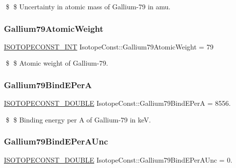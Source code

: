 \$ \$ Uncertainty in atomic mass of Gallium-\/79 in amu. \mbox{\label{group___isotope_const-_gallium-_ga79_ga2dd60aeb88e02b59578ea30111477335}} 
\subsubsection{\texorpdfstring{Gallium79\+Atomic\+Weight}{Gallium79AtomicWeight}}
{\footnotesize\ttfamily \mbox{\hyperlink{group___isotope_const-_macros_ga5f18360b3e99483a35c32d789e62621c}{I\+S\+O\+T\+O\+P\+E\+C\+O\+N\+S\+T\+\_\+\+I\+NT}} Isotope\+Const\+::\+Gallium79\+Atomic\+Weight = 79}

\$ \$ Atomic weight of Gallium-\/79. \mbox{\label{group___isotope_const-_gallium-_ga79_ga653df6a4b8a682f3f5a215d6b830aadb}} 
\subsubsection{\texorpdfstring{Gallium79\+Bind\+E\+PerA}{Gallium79BindEPerA}}
{\footnotesize\ttfamily \mbox{\hyperlink{group___isotope_const-_macros_ga8f45a7272ce02c0b4c65c44636ed719a}{I\+S\+O\+T\+O\+P\+E\+C\+O\+N\+S\+T\+\_\+\+D\+O\+U\+B\+LE}} Isotope\+Const\+::\+Gallium79\+Bind\+E\+PerA = 8556.}

\$ \$ Binding energy per A of Gallium-\/79 in keV. \mbox{\label{group___isotope_const-_gallium-_ga79_gad8f17e7f1ff0ccd69e782af2e595d1e6}} 
\subsubsection{\texorpdfstring{Gallium79\+Bind\+E\+Per\+A\+Unc}{Gallium79BindEPerAUnc}}
{\footnotesize\ttfamily \mbox{\hyperlink{group___isotope_const-_macros_ga8f45a7272ce02c0b4c65c44636ed719a}{I\+S\+O\+T\+O\+P\+E\+C\+O\+N\+S\+T\+\_\+\+D\+O\+U\+B\+LE}} Isotope\+Const\+::\+Gallium79\+Bind\+E\+Per\+A\+Unc = 0.}

